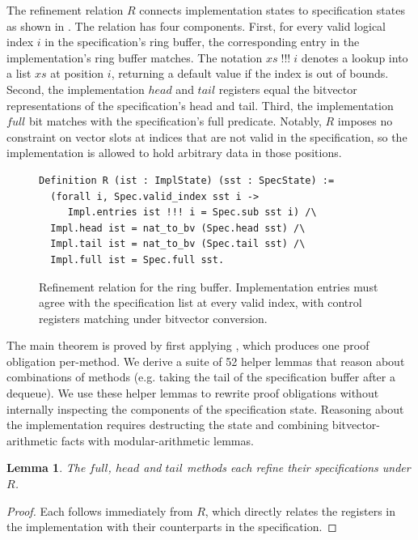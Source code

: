 \documentclass[fontset=fira-newtxsf]{mitthesis}
\theoremstyle{definition}
\theoremstyle{plain}
\newtheorem{lemma}{Lemma}[section]
\begin{document}
The refinement relation $R$ connects implementation states to specification states as shown in .
The relation has four components.
First, for every valid logical index $i$ in the specification's ring buffer, the corresponding entry in the implementation's ring buffer matches. The notation $\mathit{xs\;!!!\;i}$ denotes a lookup into a list $\mathit{xs}$ at position $\mathit{i}$, returning a default value if the index is out of bounds.
Second, the implementation $\mathit{head}$ and $\mathit{tail}$ registers equal the bitvector representations of the specification's head and tail.
Third, the implementation $\mathit{full}$ bit matches with the specification's full predicate.
Notably, $R$ imposes no constraint on vector slots at indices that are not valid in the specification, so the implementation is allowed to hold arbitrary data in those positions.

\begin{figure}[ht]
\begin{verbatim}
Definition R (ist : ImplState) (sst : SpecState) :=
  (forall i, Spec.valid_index sst i ->
     Impl.entries ist !!! i = Spec.sub sst i) /\
  Impl.head ist = nat_to_bv (Spec.head sst) /\
  Impl.tail ist = nat_to_bv (Spec.tail sst) /\
  Impl.full ist = Spec.full sst.
\end{verbatim}
\caption[Ring-buffer refinement relation]{Refinement relation for the ring buffer. Implementation entries must agree with the specification list at every valid index, with control registers matching under bitvector conversion.}
\label{fig:rb-rel}
\end{figure}

The main theorem is proved by first applying , which produces one proof obligation per-method.
We derive a suite of 52 helper lemmas that reason about combinations of methods (e.g. taking the tail of the specification buffer after a dequeue).
We use these helper lemmas to rewrite proof obligations without internally inspecting the components of the specification state.
Reasoning about the implementation requires destructing the state and combining bitvector-arithmetic facts with modular-arithmetic lemmas.

\begin{lemma} \label{lem:rb-full-tail}
The $\mathit{full}$, $\mathit{head}$ and $\mathit{tail}$ methods each refine their specifications under $R$.
\end{lemma}

\begin{proof}[Proof]
Each follows immediately from $R$, which directly relates the registers in the implementation with their counterparts in the specification.
\end{proof}
\end{document}
